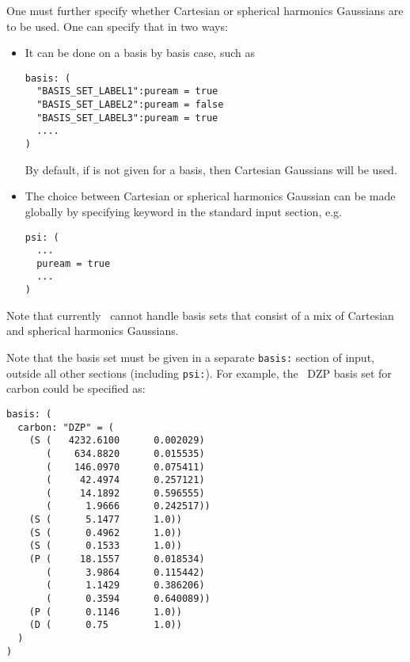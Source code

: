 One must further specify whether Cartesian or spherical harmonics
Gaussians are to be used. One can specify that in two ways:
\begin{itemize}
\item It can be done on a basis
by basis case, such as
\begin{verbatim}
basis: (
  "BASIS_SET_LABEL1":puream = true
  "BASIS_SET_LABEL2":puream = false
  "BASIS_SET_LABEL3":puream = true
  ....
)
\end{verbatim}
By default, if  is not given for a basis,
then Cartesian Gaussians will be used.
\item
The choice between Cartesian or spherical harmonics Gaussian
can be made globally by specifying  keyword
in the standard input section, e.g.
\begin{verbatim}
psi: (
  ...
  puream = true
  ...
)
\end{verbatim}
\end{itemize}
Note that currently \PSIthree\ cannot handle basis sets that consist
of a mix of Cartesian and spherical harmonics Gaussians.

Note that the basis set must be given in a separate {\tt basis:}
section of input, outside all other sections (including {\tt psi:}).
For example, the \PSIthree\ DZP basis set for carbon could be
specified as:
\begin{verbatim}
basis: (
  carbon: "DZP" = (
    (S (   4232.6100      0.002029) 
       (    634.8820      0.015535)
       (    146.0970      0.075411)
       (     42.4974      0.257121)
       (     14.1892      0.596555) 
       (      1.9666      0.242517))
    (S (      5.1477      1.0))
    (S (      0.4962      1.0))
    (S (      0.1533      1.0))
    (P (     18.1557      0.018534)
       (      3.9864      0.115442)
       (      1.1429      0.386206)
       (      0.3594      0.640089))
    (P (      0.1146      1.0))
    (D (      0.75        1.0))
  )
)
\end{verbatim}

